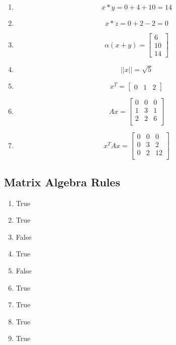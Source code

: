 \documentclass{article}
\begin{document}
\begin{enumerate}
    \item 
    \[x * y = 0 + 4 + 10 = 14\]
    \item 
    \[x * z = 0 + 2 -2 = 0\]
    \item 
    \[\alpha(x + y) = 
        \begin{bmatrix}
            6 \\ 10 \\ 14
        \end{bmatrix}
    \]
    \item 
    \[ || x || = \sqrt{5}\]
    \item 
    \[ x^T = \begin{bmatrix} 
            0  & 
            1  & 
            2  
        \end{bmatrix}
    \]
    \item 
    \[
        Ax = \begin{bmatrix}
            0 & 0 & 0 \\
            1 & 3 & 1 \\
            2 & 2 & 6 \\
        \end{bmatrix}
    \]
    \item 
    \[
        x^T A x = 
        \begin{bmatrix}
            0 &  0 &  0 \\
            0 &  3 &  2 \\
            0 &  2 & 12 \\
        \end{bmatrix}
    \]
\end{enumerate}

\subsection{Matrix Algebra Rules}
\begin{enumerate}
    \item True
    \item True
    \item False
    \item True
    \item False
    \item True
    \item True
    \item True
    \item True
\end{enumerate}
\end{document}
